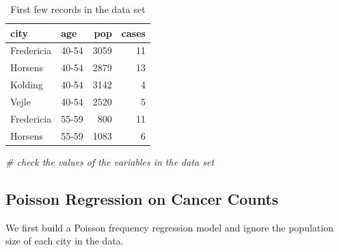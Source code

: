 \documentclass[
]{book}
\newenvironment{Shaded}{\begin{snugshade}}{\end{snugshade}}
\newcommand{\AttributeTok}[1]{\textcolor[rgb]{0.13,0.29,0.53}{#1}}
\newcommand{\CommentTok}[1]{\textcolor[rgb]{0.56,0.35,0.01}{\textit{#1}}}
\newcommand{\DocumentationTok}[1]{\textcolor[rgb]{0.56,0.35,0.01}{\textbf{\textit{#1}}}}
\newcommand{\FunctionTok}[1]{\textcolor[rgb]{0.13,0.29,0.53}{\textbf{#1}}}
\newcommand{\NormalTok}[1]{#1}
\newcommand{\OtherTok}[1]{\textcolor[rgb]{0.56,0.35,0.01}{#1}}
\newcommand{\SpecialCharTok}[1]{\textcolor[rgb]{0.81,0.36,0.00}{\textbf{#1}}}
\newcommand{\StringTok}[1]{\textcolor[rgb]{0.31,0.60,0.02}{#1}}
\begin{document}
\begin{table}

\caption{\label{tab:unnamed-chunk-142}First few records in the data set}
\centering
\begin{tabular}[t]{l|l|r|r}
\hline
city & age & pop & cases\\
\hline
Fredericia & 40-54 & 3059 & 11\\
\hline
Horsens & 40-54 & 2879 & 13\\
\hline
Kolding & 40-54 & 3142 & 4\\
\hline
Vejle & 40-54 & 2520 & 5\\
\hline
Fredericia & 55-59 & 800 & 11\\
\hline
Horsens & 55-59 & 1083 & 6\\
\hline
\end{tabular}
\end{table}

\begin{Shaded}
\begin{Highlighting}[]
\CommentTok{\# check the values of the variables in the data set}
\end{Highlighting}
\end{Shaded}

\hypertarget{poisson-regression-on-cancer-counts}{%
\subsection{Poisson Regression on Cancer Counts}\label{poisson-regression-on-cancer-counts}}

We first build a Poisson frequency regression model and ignore the population size of each city in the data.

\begin{Shaded}
\end{Shaded}
\end{document}

